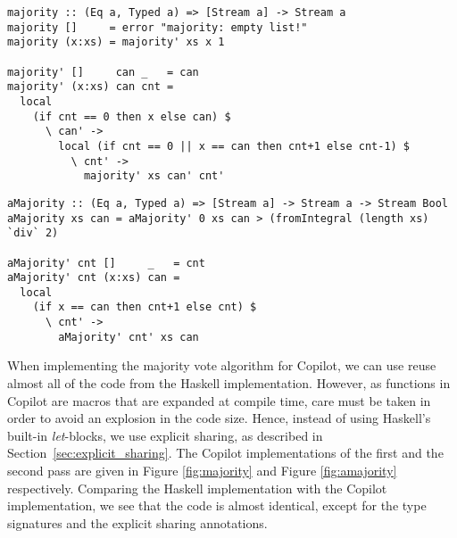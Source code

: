 \begin{figure*}[!htb]
\begin{lstlisting}[language = Copilot, frame = none]
majority :: (Eq a, Typed a) => [Stream a] -> Stream a
majority []     = error "majority: empty list!"
majority (x:xs) = majority' xs x 1

majority' []     can _   = can
majority' (x:xs) can cnt =
  local
    (if cnt == 0 then x else can) $
      \ can' ->
        local (if cnt == 0 || x == can then cnt+1 else cnt-1) $
          \ cnt' ->
            majority' xs can' cnt'
\end{lstlisting}
\caption{The first pass of the majority vote algorithm in Copilot.}
\label{fig:majority}
\end{figure*}

\begin{figure*}[!htb]
\begin{lstlisting}[language = Copilot, frame = none]
aMajority :: (Eq a, Typed a) => [Stream a] -> Stream a -> Stream Bool
aMajority xs can = aMajority' 0 xs can > (fromIntegral (length xs) `div` 2)

aMajority' cnt []     _   = cnt
aMajority' cnt (x:xs) can =
  local
    (if x == can then cnt+1 else cnt) $
      \ cnt' ->
        aMajority' cnt' xs can
\end{lstlisting}
\caption{The second pass of the majority vote algorithm in Copilot.}
\label{fig:amajority}
\end{figure*}

When implementing the majority vote algorithm for Copilot, we can use reuse
almost all of the code from the Haskell implementation. However, as functions
in Copilot are macros that are expanded at compile time, care must
be taken in order to avoid an explosion in the code size. Hence, instead of
using Haskell's built-in \emph{let}-blocks, we use explicit sharing, as
described in Section~\ref{sec:explicit_sharing}. The Copilot implementations
of the first and the second pass are given in Figure \ref{fig:majority} and
Figure \ref{fig:amajority} respectively. Comparing the Haskell implementation
with the Copilot implementation, we see that the code is almost identical,
except for the type signatures and the explicit sharing annotations.



